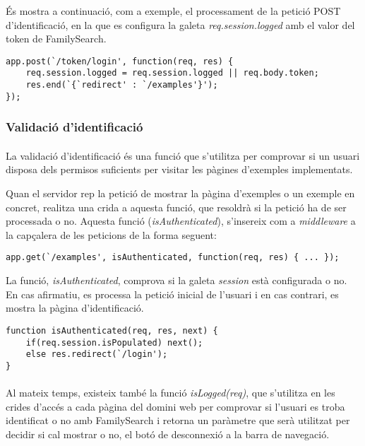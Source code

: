     És mostra a continuació, com a exemple, el processament de la petició POST d'identificació, en la que es configura la galeta \emph{req.session.logged} amb el valor del token de FamilySearch.

    \begin{lstlisting}[style=rawOwn,caption={Resposta a la petició AJAX d'identificació}]
app.post(`/token/login', function(req, res) {
    req.session.logged = req.session.logged || req.body.token;
    res.end(`{`redirect' : `/examples'}');
});
    \end{lstlisting}


    \subsubsection{Validació d'identificació}

    \paragraph{}
    La validació d'identificació és una funció que s'utilitza per comprovar si un usuari disposa dels permisos suficients per visitar les pàgines d'exemples implementats.

    Quan el servidor rep la petició de mostrar la pàgina d'exemples o un exemple en concret, realitza una crida a aquesta funció, que resoldrà si la petició ha de ser processada o no. Aquesta funció (\emph{isAuthenticated}), s'insereix com a \emph{middleware} a la capçalera de les peticions de la forma seguent:

    \begin{lstlisting}[style=rawOwn,caption={Inserció de \emph{middleware} en una petició del client}]
app.get(`/examples', isAuthenticated, function(req, res) { ... });
    \end{lstlisting}

    La funció, \emph{isAuthenticated}, comprova si la galeta \emph{session} està configurada o no. En cas afirmatiu, es processa la petició inicial de l'usuari i en cas contrari, es mostra la pàgina d'identificació.

    \begin{lstlisting}[style=rawOwn,caption={Comprovació de la galeta \emph{session}}]
function isAuthenticated(req, res, next) {
    if(req.session.isPopulated) next();
    else res.redirect(`/login');
}
    \end{lstlisting}

    \paragraph{}
    Al mateix temps, existeix també la funció \emph{isLogged(req)}, que s’utilitza en les crides d’accés a cada pàgina del domini web per comprovar si l’usuari es troba identificat o no amb FamilySearch i retorna un paràmetre que serà utilitzat per decidir si cal mostrar o no, el botó de desconnexió a la barra de navegació.

